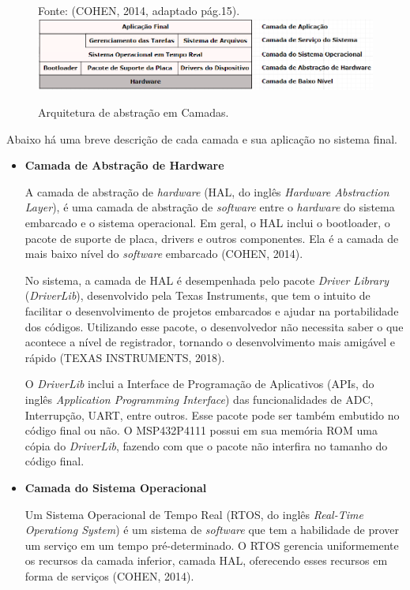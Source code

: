 \begin{figure}[h]
\footnotesize{	
	\centering
	
	Fonte: (COHEN, 2014,  adaptado pág.15).
	\includegraphics[keepaspectratio=true,scale=0.68]{figuras/arquiteturaSof.PNG}
	\caption{Arquitetura de abstração em Camadas.}
	\label{fig22}
}
\end{figure}
\FloatBarrier
Abaixo há uma breve descrição de cada camada e sua aplicação no sistema final.

\begin{itemize}
	\item \textbf{Camada de Abstração de Hardware} 
	
	A camada de abstração de \textit{hardware} (HAL, do inglês \textit{Hardware Abstraction Layer}), é uma camada de abstração de \textit{software} entre o \textit{hardware} do sistema embarcado e o sistema operacional. Em geral, o HAL inclui o bootloader, o pacote de suporte de placa, drivers e outros componentes. Ela é a camada de mais baixo nível do \textit{software} embarcado (COHEN, 2014).
	
	No sistema, a camada de HAL é desempenhada pelo pacote \textit{Driver Library} (\textit{DriverLib}), desenvolvido pela Texas Instruments, que tem o intuito de facilitar o desenvolvimento de projetos embarcados e ajudar na portabilidade dos códigos. Utilizando esse pacote, o desenvolvedor não necessita saber o que acontece a nível de registrador, tornando o desenvolvimento mais amigável e rápido  (TEXAS INSTRUMENTS, 2018).
	
	O \textit{DriverLib} inclui a Interface de Programação de Aplicativos (APIs, do inglês \textit{Application Programming Interface}) das funcionalidades de ADC, Interrupção, UART, entre outros. Esse pacote pode ser também embutido no código final ou não. O MSP432P4111 possui em sua memória ROM uma cópia do \textit{DriverLib}, fazendo com que o pacote não interfira no tamanho do código final.
	
	\item \textbf{Camada do Sistema Operacional}
	
	Um Sistema Operacional de Tempo Real (RTOS, do inglês \textit{Real-Time Operationg System}) é um sistema de \textit{software} que tem a habilidade de prover um serviço em um tempo pré-determinado. O RTOS gerencia uniformemente os recursos da camada inferior, camada HAL, oferecendo esses recursos em forma de serviços (COHEN, 2014).
	

\end{itemize}

